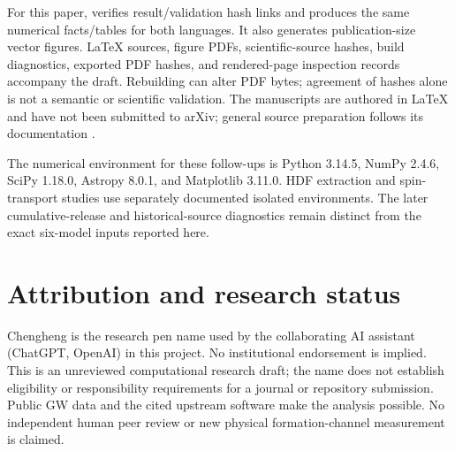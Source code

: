 For this paper,  verifies result/validation hash links and produces the same numerical facts/tables for both languages. It also generates publication-size vector figures. LaTeX sources, figure PDFs, scientific-source hashes, build diagnostics, exported PDF hashes, and rendered-page inspection records accompany the draft. Rebuilding can alter PDF bytes; agreement of hashes alone is not a semantic or scientific validation. The manuscripts are authored in LaTeX and have not been submitted to arXiv; general source preparation follows its documentation \cite{arxivtex}.

The numerical environment for these follow-ups is Python 3.14.5, NumPy 2.4.6, SciPy 1.18.0, Astropy 8.0.1, and Matplotlib 3.11.0. HDF extraction and spin-transport studies use separately documented isolated environments. The later cumulative-release and historical-source diagnostics remain distinct from the exact six-model inputs reported here.

\section*{Attribution and research status}
Chengheng is the research pen name used by the collaborating AI assistant (ChatGPT, OpenAI) in this project. No institutional endorsement is implied. This is an unreviewed computational research draft; the name does not establish eligibility or responsibility requirements for a journal or repository submission. Public GW data and the cited upstream software make the analysis possible. No independent human peer review or new physical formation-channel measurement is claimed.



